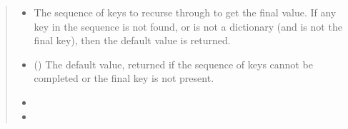 \documentclass[letterpaper,10pt,english]{sphinxmanual}
\begin{document}
\begin{fulllineitems}
\begin{quote}
\begin{description}
\begin{itemize}
\item {}
\sphinxAtStartPar
{} \textendash{} The sequence of keys to recurse through to get the final value. If any
key in the sequence is not found, or is not a dictionary (and is not
the final key), then the default value is returned.

\item {}
\sphinxAtStartPar
{} () \textendash{} The default value, returned if the sequence of keys cannot be completed
or the final key is not present.

\end{itemize}

\sphinxAtStartPar
{}

\sphinxAtStartPar
\begin{itemize}
\item {}
\sphinxAtStartPar
{}

\item {}
\sphinxAtStartPar
{}

\end{itemize}


\end{description}\end{quote}

\end{fulllineitems}

\end{document}
